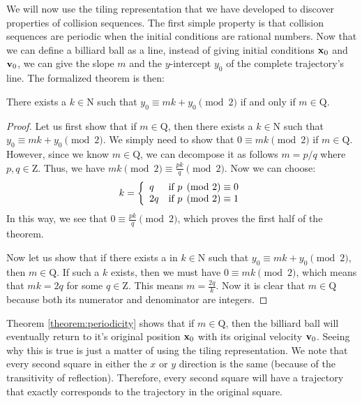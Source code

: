 We will now use the tiling representation that we have developed to discover properties of collision sequences. The first simple property is that collision sequences are periodic when the initial conditions are rational numbers. Now that we can define a billiard ball as a line, instead of giving initial conditions $\mathbf{x}_0$ and $\mathbf{v}_0$, we can give the slope $m$ and the $y$-intercept $y_0$ of the complete trajectory's line. The formalized theorem is then:

\begin{theorem}
  \label{theorem:periodicity}
  There exists a $k \in \mathrm{N}$ such that $y_0 \equiv mk + y_0 \pmod{2}$ if and only if $m \in \mathrm{Q}$.
\end{theorem}
\begin{proof}
  Let us first show that if $m \in \mathrm{Q}$, then there exists a $k \in \mathrm{N}$ such that $y_0 \equiv mk + y_0 \pmod{2}$. We simply need to show that $0 \equiv mk \pmod{2}$ if $m \in \mathrm{Q}$. However, since we know $m \in \mathrm{Q}$, we can decompose it as follows $m = p/q$ where $p,q \in \mathrm{Z}$. Thus, we have $mk \pmod{2} \equiv \frac{pk}{q} \pmod{2}$. Now we can choose:
  \begin{eqnarray}
    k = \left\{\begin{array}{l c}
      q & \textrm{if } p \pmod{2} \equiv 0 \\
      2q & \textrm{if } p \pmod{2} \equiv 1
    \end{array}\right.
  \end{eqnarray}
  In this way, we see that $0 \equiv \frac{pk}{q} \pmod{2}$, which proves the first half of the theorem.

  Now let us show that if there exists a in $k \in \mathrm{N}$ such that $y_0 \equiv mk + y_0 \pmod{2}$, then $m \in \mathrm{Q}$. If such a $k$ exists, then we must have $0 \equiv mk \pmod{2}$, which means that $mk = 2q$ for some $q \in \mathrm{Z}$. This means $m = \frac{2q}{k}$. Now it is clear that $m \in \mathrm{Q}$ because both its numerator and denominator are integers.
\end{proof}

Theorem \ref{theorem:periodicity} shows that if $m \in \mathrm{Q}$, then the billiard ball will eventually return to it's original position $\mathbf{x}_0$ with its original velocity $\mathbf{v}_0$. Seeing why this is true is just a matter of using the tiling representation. We note that every second square in either the $x$ or $y$ direction is the same (because of the transitivity of reflection). Therefore, every second square will have a trajectory that exactly corresponds to the trajectory in the original square.

